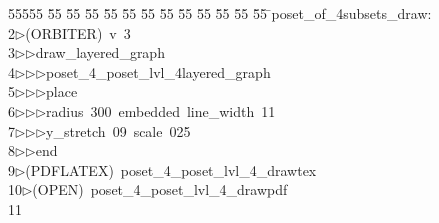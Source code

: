 %
%
\begin{tabbing}
55555 \= 55 \= 55 \= 55 \= 55 \= 55 \= 55 \= 55 \= 55 \= 55 \= 55 \= 55 \= 55 \= \>poset\_of\_4subsets\_draw:\\[0pt]
2\>$\triangleright$\>(ORBITER)\ v\ 3\ \\[0pt]
3\>$\triangleright$\>$\triangleright$\>draw\_layered\_graph\ \\[0pt]
4\>$\triangleright$\>$\triangleright$\>$\triangleright$\>poset\_4\_poset\_lvl\_4layered\_graph\ \\[0pt]
5\>$\triangleright$\>$\triangleright$\>$\triangleright$\>place\ \\[0pt]
6\>$\triangleright$\>$\triangleright$\>$\triangleright$\>radius\ 300\ embedded\ line\_width\ 11\ \\[0pt]
7\>$\triangleright$\>$\triangleright$\>$\triangleright$\>y\_stretch\ 09\ scale\ 025\ \\[0pt]
8\>$\triangleright$\>$\triangleright$\>end\\[0pt]
9\>$\triangleright$\>(PDFLATEX)\ poset\_4\_poset\_lvl\_4\_drawtex\\[0pt]
10\>$\triangleright$\>(OPEN)\ poset\_4\_poset\_lvl\_4\_drawpdf\\[0pt]
11\>\end{tabbing}
